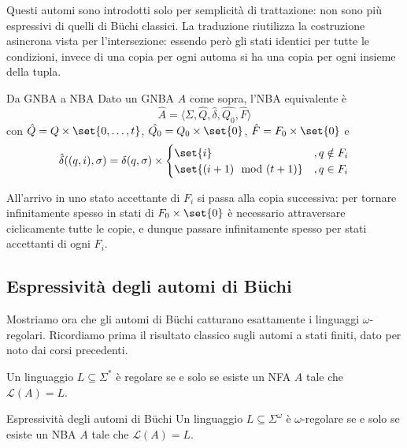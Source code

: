 Questi automi sono introdotti solo per semplicità di trattazione: non sono più espressivi di quelli di Büchi classici. La traduzione riutilizza la costruzione asincrona vista per l'intersezione: essendo però gli stati identici per tutte le condizioni, invece di una copia per ogni automa si ha una copia per ogni insieme della tupla.

\begin{definition}{Da GNBA a NBA}
  Dato un GNBA \(A\) come sopra, l'NBA equivalente è
  \[\hat{A} = \langle\Sigma, \hat{Q},\hat{\delta},\hat{Q_0},\hat{F}\rangle\]
  con \(\hat{Q}=Q\times\set{0,\ldots,t}\), \(\hat{Q_0}=Q_0\times\set{0}\), \(\hat{F}=F_0\times\set{0}\) e
  \[\hat{\delta}((q,i),\sigma) = \delta(q,\sigma) \times \begin{cases}
      \set{i}                & ,q\notin F_i \\
      \set{(i+1) \mod (t+1)} & ,q\in F_i
    \end{cases}\]
\end{definition}

All'arrivo in uno stato accettante di \(F_i\) si passa alla copia successiva: per tornare infinitamente spesso in stati di \(F_0\times\set{0}\) è necessario attraversare ciclicamente tutte le copie, e dunque passare infinitamente spesso per stati accettanti di ogni \(F_i\).

\subsection{Espressività degli automi di Büchi}

Mostriamo ora che gli automi di Büchi catturano esattamente i linguaggi \(\omega\)-regolari. Ricordiamo prima il risultato classico sugli automi a stati finiti, dato per noto dai corsi precedenti.

\begin{theorem}{}
  Un linguaggio \(L \subseteq \Sigma^*\) è regolare se e solo se esiste un NFA \(A\) tale che \(\mathcal{L}(A) = L\).
\end{theorem}

\begin{theorem}{Espressività degli automi di Büchi}
  Un linguaggio \(L \subseteq \Sigma^\omega\) è \(\omega\)-regolare se e solo se esiste un NBA \(A\) tale che \(\mathcal{L}(A) = L\).
\end{theorem}

